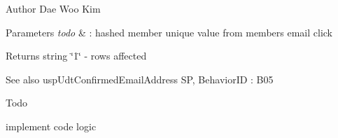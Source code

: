 \begin{DoxyAuthor}{Author}
Dae Woo Kim 
\end{DoxyAuthor}

\begin{DoxyParams}{Parameters}
{\em todo} & \+: hashed member unique value from member\textquotesingle{}s email click \\
\hline
\end{DoxyParams}
\begin{DoxyReturn}{Returns}
string \char`\"{}1\char`\"{} -\/ rows affected 
\end{DoxyReturn}
\begin{DoxySeeAlso}{See also}
usp\+Udt\+Confirmed\+Email\+Address SP, Behavior\+ID \+: B05 
\end{DoxySeeAlso}
\begin{DoxyRefDesc}{Todo}
\item[\hyperlink{a00001__todo000014}{Todo}]implement code logic \end{DoxyRefDesc}
